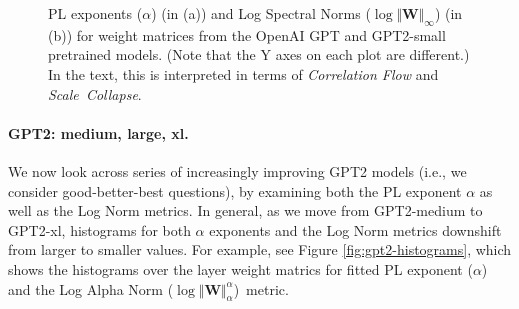 \begin{figure}[htb]
    \centering
    \quad
    \caption{PL exponents ($\alpha$) (in (a)) and Log Spectral Norms ($\log\Vert\mathbf{W}\Vert_{\infty}$) (in (b)) for weight matrices from the OpenAI GPT and GPT2-small pretrained models.  (Note that the Y axes on each plot are different.)
             In the text, this is interpreted in terms of \emph{Correlation Flow} and \emph{Scale~Collapse}.
            }
    \label{fig:gpt-alpha-layers}
\end{figure}


\paragraph{GPT2: medium, large, xl.} 

We now look across series of increasingly improving GPT2 models (i.e., we consider good-better-best questions), by examining both the PL exponent $\alpha$ as well as the Log Norm metrics.  
In general, as we move from GPT2-medium to GPT2-xl, histograms for both $\alpha$ exponents and the Log Norm metrics downshift from larger to smaller values. 
For example, see Figure \ref{fig:gpt2-histograms}, which shows the histograms over the layer weight matrics for fitted PL exponent ($\alpha$) and the Log Alpha Norm ($\log\Vert\mathbf{W}\Vert_{\alpha}^{\alpha}$)~metric.

